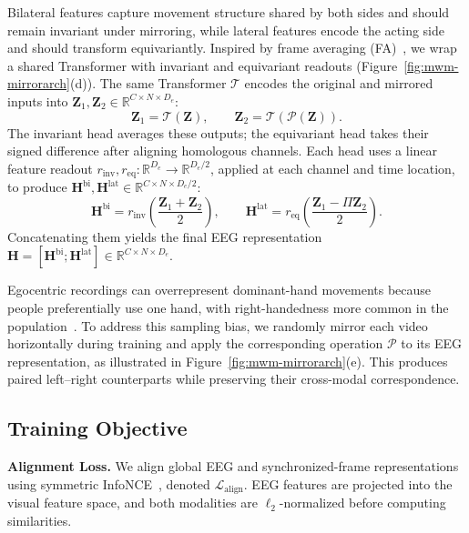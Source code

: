 Bilateral features capture movement structure shared by both sides and should remain invariant under mirroring, while lateral features encode the acting side and should transform equivariantly. Inspired by frame averaging (FA)~\citep{puny2022frame}, we wrap a shared Transformer with invariant and equivariant readouts (Figure~\ref{fig:mwm-mirrorarch}(d)). The same Transformer $\mathcal{T}$ encodes the original and mirrored inputs into $\mathbf{Z}_1,\mathbf{Z}_2\in\mathbb{R}^{C\times N\times D_e}$:
\begin{equation}
    \mathbf{Z}_1=\mathcal{T}(\mathbf{Z}), \qquad
    \mathbf{Z}_2=\mathcal{T}(\mathcal{P}(\mathbf{Z})).
\end{equation}
The invariant head averages these outputs; the equivariant head takes their signed difference after aligning homologous channels. Each head uses a linear feature readout $r_{\mathrm{inv}},r_{\mathrm{eq}}:\mathbb{R}^{D_e}\to\mathbb{R}^{D_e/2}$, applied at each channel and time location, to produce $\mathbf{H}^{\mathrm{bi}},\mathbf{H}^{\mathrm{lat}}\in\mathbb{R}^{C\times N\times D_e/2}$:
\begin{equation}
    \mathbf{H}^{\mathrm{bi}}
    = r_{\mathrm{inv}}\!\left(\frac{\mathbf{Z}_1+\mathbf{Z}_2}{2}\right), \qquad
    \mathbf{H}^{\mathrm{lat}}
    = r_{\mathrm{eq}}\!\left(\frac{\mathbf{Z}_1-\Pi\mathbf{Z}_2}{2}\right).
\end{equation}
Concatenating them yields the final EEG representation $\mathbf{H}=\left[\mathbf{H}^{\mathrm{bi}};\mathbf{H}^{\mathrm{lat}}\right]\in\mathbb{R}^{C\times N\times D_e}$.

Egocentric recordings can overrepresent dominant-hand movements because people preferentially use one hand, with right-handedness more common in the population~\citep{papadatou2020handedness}. To address this sampling bias, we randomly mirror each video horizontally during training and apply the corresponding operation $\mathcal{P}$ to its EEG representation, as illustrated in Figure~\ref{fig:mwm-mirrorarch}(e). This produces paired left--right counterparts while preserving their cross-modal correspondence.

\subsection{Training Objective}

\noindent\textbf{Alignment Loss.}
We align global EEG and synchronized-frame representations using symmetric InfoNCE~\citep{oord2018representation}, denoted $\mathcal{L}_{\mathrm{align}}$. EEG features are projected into the visual feature space, and both modalities are $\ell_2$-normalized before computing similarities.

